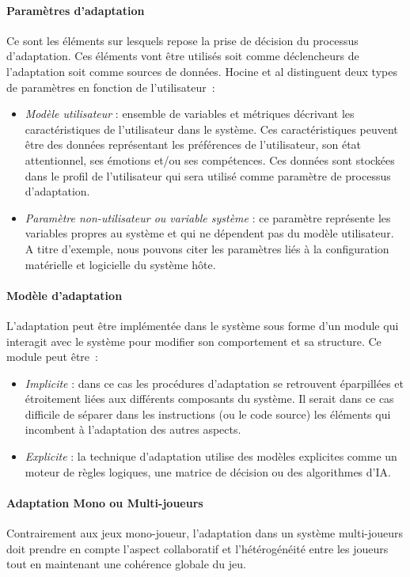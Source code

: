 	\paragraph{Paramètres d'adaptation\\}
Ce sont les éléments sur lesquels repose la prise de décision du processus d'adaptation. Ces éléments vont être utilisés soit comme déclencheurs de l'adaptation soit comme sources de données. Hocine et al distinguent deux types de paramètres en fonction de l'utilisateur~:
\begin{itemize}
	\item \emph{Modèle utilisateur} : ensemble de variables et métriques décrivant les caractéristiques de l’utilisateur dans le système. Ces caractéristiques peuvent être des données représentant les préférences de l’utilisateur, son état attentionnel, ses émotions et/ou ses compétences. Ces données sont stockées dans le profil de l’utilisateur qui sera utilisé comme paramètre de processus d’adaptation.
	\item \emph{Paramètre non-utilisateur ou variable système }: ce paramètre représente les variables propres au système et qui ne dépendent pas du modèle utilisateur. A titre d'exemple, nous pouvons citer les paramètres liés à la configuration matérielle et logicielle du système hôte.
\end{itemize}

	\paragraph{Modèle d'adaptation\\}
	L’adaptation peut être implémentée dans le système sous forme d’un module qui interagit avec le système pour modifier son comportement et sa structure. Ce module peut être~:
\begin{itemize}
	\item \emph{Implicite} : dans ce cas les procédures d'adaptation se retrouvent éparpillées et étroitement liées aux différents composants du système. Il serait dans ce cas difficile de séparer dans les instructions (ou le code source) les éléments qui incombent à l'adaptation des autres aspects.
	\item \emph{Explicite }: la technique d'adaptation utilise des modèles explicites comme un moteur de règles logiques, une matrice de décision ou des algorithmes d’IA.
\end{itemize}
	
	\paragraph{Adaptation Mono ou Multi-joueurs\\}
Contrairement aux jeux mono-joueur, l'adaptation dans un système multi-joueurs doit prendre en compte l'aspect collaboratif et l'hétérogénéité entre les joueurs tout  en maintenant une cohérence globale du jeu.
	
